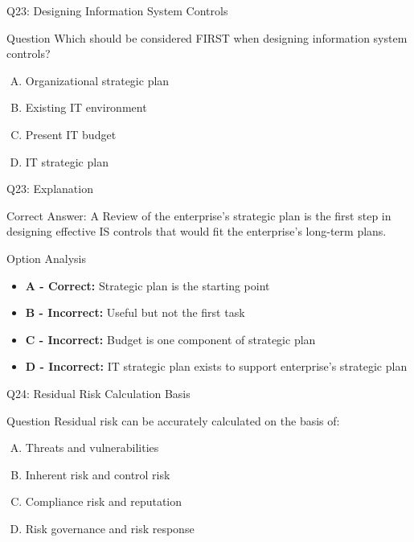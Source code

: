 \documentclass{beamer}
\begin{document}
	\begin{frame}{Q23: Designing Information System Controls}
		\begin{block}{Question}
			Which should be considered FIRST when designing information system controls?
		\end{block}
		\begin{enumerate}[(A)]
			\item Organizational strategic plan
			\item Existing IT environment
			\item Present IT budget
			\item IT strategic plan
		\end{enumerate}
	\end{frame}
	
	\begin{frame}{Q23: Explanation}
		\begin{block}{Correct Answer: A}
			Review of the enterprise's strategic plan is the first step in designing effective IS controls that would fit the enterprise's long-term plans.
		\end{block}
		\begin{block}{Option Analysis}
			\begin{itemize}
				\item \textbf{A - Correct:} Strategic plan is the starting point
				\item \textbf{B - Incorrect:} Useful but not the first task
				\item \textbf{C - Incorrect:} Budget is one component of strategic plan
				\item \textbf{D - Incorrect:} IT strategic plan exists to support enterprise's strategic plan
			\end{itemize}
		\end{block}
	\end{frame}
	
	\begin{frame}{Q24: Residual Risk Calculation Basis}
		\begin{block}{Question}
			Residual risk can be accurately calculated on the basis of:
		\end{block}
		\begin{enumerate}[(A)]
			\item Threats and vulnerabilities
			\item Inherent risk and control risk
			\item Compliance risk and reputation
			\item Risk governance and risk response
		\end{enumerate}
	\end{frame}
	
\end{document}

